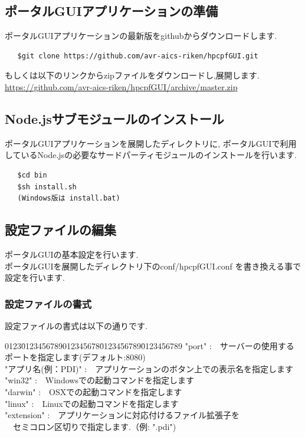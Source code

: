 \documentclass[a4paper,10pt,oneside]{jsbook}
\begin{document}
\subsection{ポータルGUIアプリケーションの準備}
ポータルGUIアプリケーションの最新版をgithubからダウンロードします.
\begin{verbatim}
   $git clone https://github.com/avr-aics-riken/hpcpfGUI.git
\end{verbatim}
もしくは以下のリンクからzipファイルをダウンロードし,展開します.\\
	\url{https://github.com/avr-aics-riken/hpcpfGUI/archive/master.zip}

\newpage

\subsection{Node.jsサブモジュールのインストール}
ポータルGUIアプリケーションを展開したディレクトリに,
ポータルGUIで利用しているNode.jsの必要なサードパーティモジュールのインストールを行います.
\begin{verbatim}
   $cd bin
   $sh install.sh 
   (Windows版は install.bat)
\end{verbatim}

\newpage

\subsection{設定ファイルの編集}
\label{sec:editconfig}
ポータルGUIの基本設定を行います.\\
ポータルGUIを展開したディレクトリ下のconf/hpcpfGUI.conf
を書き換える事で設定を行います.\\

\subsubsection{設定ファイルの書式}
設定ファイルの書式は以下の通りです.
\label{sec:editconfig_format}
\begin{tabbing}
0123\=0123456789012345678\=0123456789\=0123456789\kill
\> "port"     \>:\ \ サーバーの使用するポートを指定します(デフォルト:8080)\\
\> "アプリ名(例：PDI)" \>:\ \ アプリケーションのボタン上での表示名を指定します\\
\>                 \>"win32" \>:\ \ Windowsでの起動コマンドを指定します\\
\>                 \>"darwin" \>:\ \ OSXでの起動コマンドを指定します\\
\>                 \>"linux" \>:\ \ Linuxでの起動コマンドを指定します\\
\>                 \>"extension" \>:\ \ アプリケーションに対応付けるファイル拡張子を\\
\>                 \>                    \>\  \ セミコロン区切りで指定します.（例: ".pdi")\\
\end{tabbing}
\end{document}
